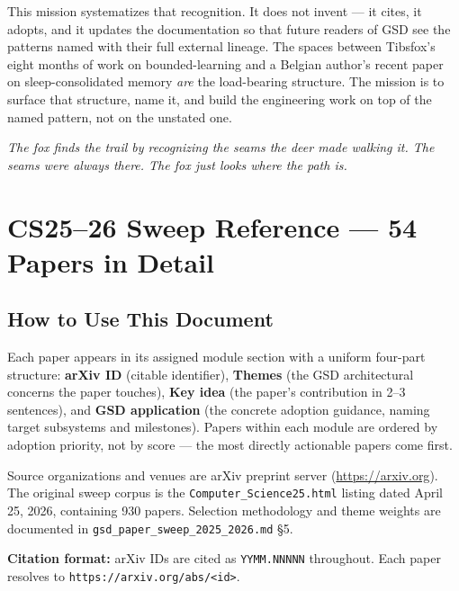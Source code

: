 \documentclass[11pt,letterpaper]{article}
\newcommand{\stageheader}[2]{%
  \noindent\colorbox{#2}{\makebox[\textwidth][l]{%
    \textcolor{white}{\bfseries\sffamily\hspace{6pt}#1\hspace{6pt}}}}%
  \vspace{0.5em}\par%
}
\newcommand{\arxivid}[1]{\texttt{\textcolor{accent}{#1}}}
\begin{document}
This mission systematizes that recognition. It does not invent --- it cites, it adopts, and it updates the documentation so that future readers of GSD see the patterns named with their full external lineage. The spaces between Tibsfox's eight months of work on bounded-learning and a Belgian author's recent paper on sleep-consolidated memory \textit{are} the load-bearing structure. The mission is to surface that structure, name it, and build the engineering work on top of the named pattern, not on the unstated one.

\textit{The fox finds the trail by recognizing the seams the deer made walking it. The seams were always there. The fox just looks where the path is.}

\newpage

\stageheader{STAGE 2 --- RESEARCH REFERENCE}{secondary}

\section{CS25--26 Sweep Reference --- 54 Papers in Detail}

\subsection{How to Use This Document}

Each paper appears in its assigned module section with a uniform four-part structure: \textbf{arXiv ID} (citable identifier), \textbf{Themes} (the GSD architectural concerns the paper touches), \textbf{Key idea} (the paper's contribution in 2--3 sentences), and \textbf{GSD application} (the concrete adoption guidance, naming target subsystems and milestones). Papers within each module are ordered by adoption priority, not by score --- the most directly actionable papers come first.

Source organizations and venues are arXiv preprint server (\url{https://arxiv.org}). The original sweep corpus is the \texttt{Computer\_Science25.html} listing dated April 25, 2026, containing 930 papers. Selection methodology and theme weights are documented in \texttt{gsd\_paper\_sweep\_2025\_2026.md} \S5.

\textbf{Citation format:} arXiv IDs are cited as \arxivid{YYMM.NNNNN} throughout. Each paper resolves to \texttt{https://arxiv.org/abs/<id>}.
\end{document}
